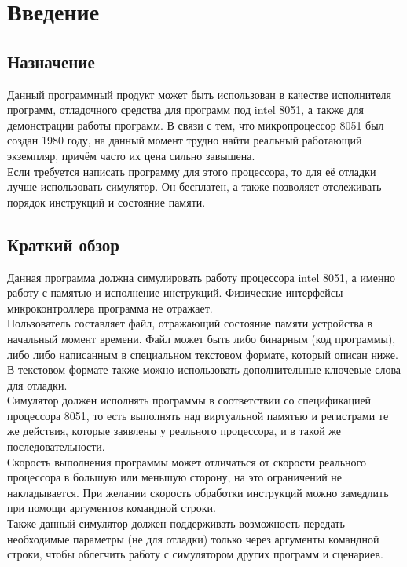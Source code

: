 





\large



\tableofcontents
\newpage


\section{Введение}
\subsection{Назначение}
Данный программный продукт может быть использован в качестве исполнителя программ, отладочного средства для программ под intel 8051, а также для демонстрации работы программ. В связи с тем, что микропроцессор 8051 был создан 1980 году, на данный момент трудно найти реальный работающий экземпляр, причём часто их цена сильно завышена.\\
Если требуется написать программу для этого процессора, то для её отладки лучше использовать симулятор. Он бесплатен, а также позволяет отслеживать порядок инструкций и состояние памяти.\\
\subsection{Краткий обзор}
Данная программа должна симулировать работу процессора intel 8051, а именно работу с памятью и исполнение инструкций. Физические интерфейсы микроконтроллера программа не отражает.\\
Пользователь составляет файл, отражающий состояние памяти устройства в начальный момент времени. Файл может быть либо бинарным (код программы), либо либо написанным в специальном текстовом формате, который описан ниже. В текстовом формате также можно использовать дополнительные ключевые слова для отладки.\\
Симулятор должен исполнять программы в соответствии со спецификацией процессора 8051, то есть выполнять над виртуальной памятью и регистрами те же действия, которые заявлены у реального процессора, и в такой же последовательности. \\
Скорость выполнения программы может отличаться от скорости реального процессора в большую или меньшую сторону, на это ограничений не накладывается.
При желании скорость обработки инструкций можно замедлить при помощи аргументов командной строки. \\
Также данный симулятор должен поддерживать возможность передать необходимые параметры (не для отладки) только через аргументы командной строки, чтобы облегчить работу с симулятором других программ и сценариев.
